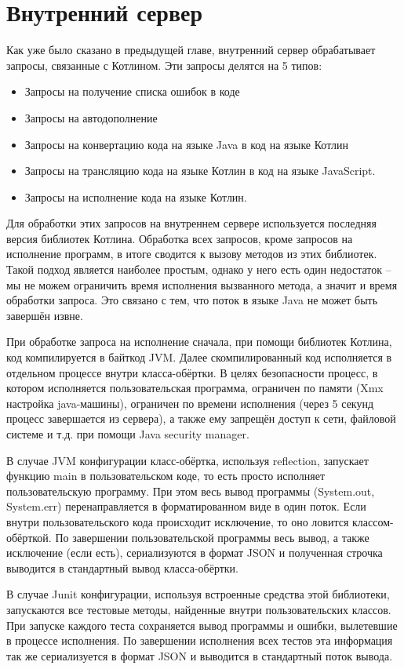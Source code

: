 \section{Внутренний сервер}
	Как уже было сказано в предыдущей главе, внутренний
сервер обрабатывает запросы, связанные с Котлином. Эти запросы делятся на 5 типов:
\begin{itemize}
	\item Запросы на получение списка ошибок в коде
	\item Запросы на автодополнение
	\item Запросы на конвертацию кода на языке Java в код на языке Котлин
	\item Запросы на трансляцию кода на языке  Котлин в код на языке JavaScript.
	\item Запросы на исполнение кода на языке Котлин.
\end{itemize}
	Для обработки этих запросов на внутреннем сервере используется последняя версия библиотек Котлина. Обработка всех запросов, кроме запросов на исполнение программ, в итоге сводится к вызову методов из этих библиотек. Такой подход является наиболее простым, однако у него есть один недостаток -- мы не можем ограничить время исполнения вызванного метода, а значит и время обработки запроса. Это связано с тем, что поток в языке Java не может быть завершён извне. 
	
	При обработке запроса на исполнение сначала, при помощи библиотек Котлина, код компилируется в байткод JVM. Далее скомпилированный код исполняется в отдельном процессе внутри класса-обёртки. В целях безопасности	процесс, в котором исполняется пользовательская программа, ограничен по памяти (Xmx настройка java-машины), ограничен по времени исполнения (через 5 секунд процесс завершается из сервера), а также ему запрещён доступ к сети, файловой системе и т.д. при помощи Java security manager. 
	
	В случае JVM конфигурации класс-обёртка, используя reflection, запускает функцию main в пользовательском коде, то есть просто исполняет пользовательскую программу. При этом весь вывод программы (System.out, System.err) перенаправляется в форматированном виде в один поток. Если внутри пользовательского кода происходит исключение, то оно ловится классом-обёрткой. По завершении пользовательской программы весь вывод, а также исключение (если есть), сериализуются в формат JSON и полученная строчка выводится в стандартный вывод класса-обёртки.
	
	В случае Junit конфигурации, используя встроенные средства этой библиотеки, запускаются все тестовые методы, найденные внутри пользовательских классов. При запуске каждого теста сохраняется вывод программы и ошибки, вылетевшие в процессе исполнения. По завершении исполнения всех тестов эта информация так же сериализуется в формат JSON и выводится в стандартный поток вывода.
	

	
	
	